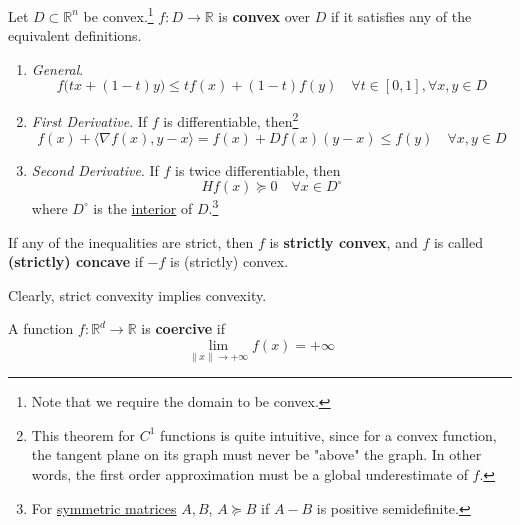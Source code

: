 	\begin{definition}
		\label{def:convex_function}
		Let $D \subset \mathbb{R}^n$ be convex.\footnote{Note that we require the domain to be convex.} $f: D \to \mathbb{R}$ is \textbf{convex} over $D$ if it satisfies any of the equivalent definitions. 
		\begin{enumerate}
		  \item \textit{General}. 
				\begin{equation}
					f\big( t x + (1 - t) y \big) \leq t f(x) + (1 - t) f(y) \quad \forall t \in [0, 1], \forall x, y \in D
				\end{equation}

			\item \textit{First Derivative}. If $f$ is differentiable, then\footnote{This theorem for $C^1$ functions is quite intuitive, since for a convex function, the tangent plane on its graph must never be "above" the graph. In other words, the first order approximation must be a global underestimate of $f$. }
				\begin{equation}
					f(x) + \langle \nabla f(x), y - x \rangle = f(x) + D f(x) (y - x) \leq f(y) \quad \forall x, y \in D
				\end{equation}

			\item \textit{Second Derivative}. If $f$ is twice differentiable, then 
				\begin{equation}
				  Hf(x) \succeq 0 \quad \forall x \in D^\circ
				\end{equation}
				where $D^\circ$ is the \hyperref[pst-def:interior]{interior} of $D$.\footnote{For \hyperref[lin-def:symmetric-matrices]{symmetric matrices} $A, B$, $A \succeq B$ if $A - B$ is positive semidefinite.}
		\end{enumerate}
		If any of the inequalities are strict, then $f$ is \textbf{strictly convex}, and $f$ is called \textbf{(strictly) concave} if $-f$ is (strictly) convex. 
	\end{definition}

	Clearly, strict convexity implies convexity. 

	\begin{definition}
		\label{def:coercive}
	  A function $f: \mathbb{R}^d \to \mathbb{R}$ is \textbf{coercive} if 
		\begin{equation}
			\lim_{\|x\| \to +\infty} f(x) = +\infty
		\end{equation}
	\end{definition}

